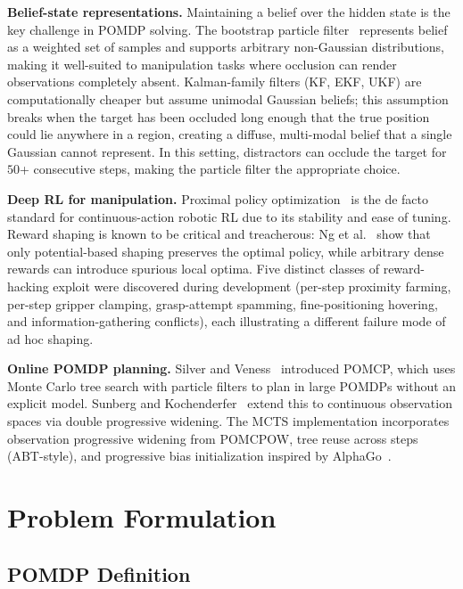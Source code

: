 \documentclass[conference]{IEEEtran}
\begin{document}
\textbf{Belief-state representations.}
Maintaining a belief over the hidden state is the key challenge in POMDP
solving.
The bootstrap particle filter~\cite{gordon1993novel} represents belief as a
weighted set of samples and supports arbitrary non-Gaussian distributions,
making it well-suited to manipulation tasks where occlusion can render
observations completely absent.
Kalman-family filters (KF, EKF, UKF) are computationally cheaper but assume
unimodal Gaussian beliefs; this assumption breaks when the target has been
occluded long enough that the true position could lie anywhere in a region,
creating a diffuse, multi-modal belief that a single Gaussian cannot represent.
In this setting, distractors can occlude the target for $50$+ consecutive steps,
making the particle filter the appropriate choice.

\textbf{Deep RL for manipulation.}
Proximal policy optimization~\cite{schulman2017ppo} is the de facto standard
for continuous-action robotic RL due to its stability and ease of tuning.
Reward shaping is known to be critical and treacherous: Ng et al.~\cite{ng1999potential}
show that only potential-based shaping preserves the optimal policy, while
arbitrary dense rewards can introduce spurious local optima.
Five distinct classes of reward-hacking exploit were discovered during development
(per-step proximity farming, per-step gripper clamping, grasp-attempt spamming,
fine-positioning hovering, and information-gathering conflicts), each illustrating
a different failure mode of ad hoc shaping.

\textbf{Online POMDP planning.}
Silver and Veness~\cite{silver2010pomcp} introduced POMCP, which uses
Monte Carlo tree search with particle filters to plan in large POMDPs without
an explicit model.
Sunberg and Kochenderfer~\cite{sunberg2018pomcpow} extend this to continuous
observation spaces via double progressive widening.
The MCTS implementation incorporates observation progressive widening from
POMCPOW, tree reuse across steps (ABT-style), and progressive bias initialization
inspired by AlphaGo~\cite{silver2016alphago}.

\section{Problem Formulation}
\label{sec:problem}

\subsection{POMDP Definition}
\end{document}
